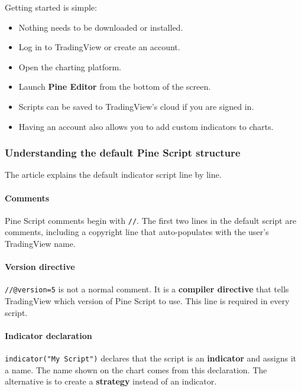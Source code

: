 \documentclass[12pt,openany]{book}
\begin{document}
Getting started is simple:

\begin{itemize}[leftmargin=*]
    \item Nothing needs to be downloaded or installed.
    \item Log in to TradingView or create an account.
    \item Open the charting platform.
    \item Launch \textbf{Pine Editor} from the bottom of the screen.
    \item Scripts can be saved to TradingView's cloud if you are signed in.
    \item Having an account also allows you to add custom indicators to charts.
\end{itemize}

\subsubsection{Understanding the default Pine Script structure}

The article explains the default indicator script line by line.

\paragraph{Comments}

Pine Script comments begin with \texttt{//}. The first two lines in the default script are comments, including a copyright line that auto-populates with the user's TradingView name.

\paragraph{Version directive}

\texttt{//@version=5} is not a normal comment. It is a \textbf{compiler directive} that tells TradingView which version of Pine Script to use. This line is required in every script.

\paragraph{Indicator declaration}

\texttt{indicator("My Script")} declares that the script is an \textbf{indicator} and assigns it a name. The name shown on the chart comes from this declaration. The alternative is to create a \textbf{strategy} instead of an indicator.
\end{document}
